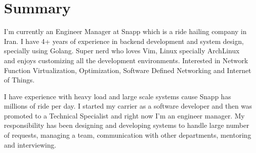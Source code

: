 \section{Summary}\closesection{}

I'm currently an Engineer Manager at Snapp which is a ride hailing company in Iran. I have 4+ years of experience in backend development and system design,
specially using Golang.
Super nerd who loves Vim, Linux specially ArchLinux and enjoys customizing all the development environments.
Interested in Network Function Virtualization, Optimization, Software Defined Networking and Internet of Things.

I have experience with heavy load and large scale systems cause Snapp has millions of ride per day.
I started my carrier as a software developer and then was promoted to a Technical Specialist and right now I'm an engineer manager.
My responsibility has been designing and developing systems to handle
large number of requests, managing a team, communication with other departments, mentoring and interviewing.
